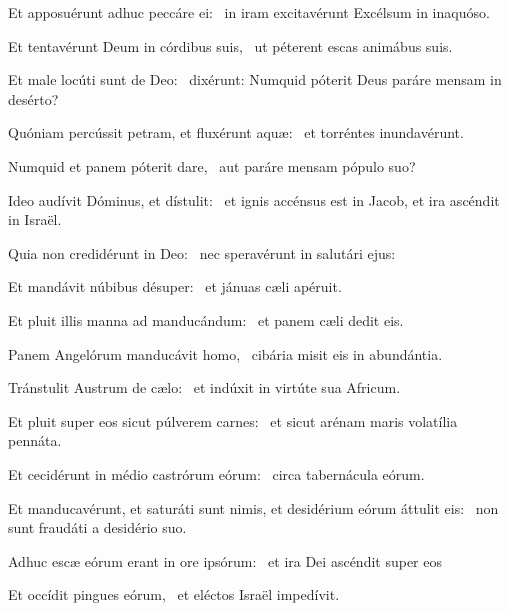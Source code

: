
\item Et apposuérunt adhuc peccáre ei:~\psstar{} in iram excitavérunt Excélsum in inaquóso.

\item Et tentavérunt Deum in córdibus suis,~\psstar{} ut péterent escas animábus suis.

\item Et male locúti sunt de Deo:~\psstar{} dixérunt: Numquid póterit Deus paráre mensam in desérto?

\item Quóniam percússit petram, et fluxérunt aquæ:~\psstar{} et torréntes inundavérunt.

\item Numquid et panem póterit dare,~\psstar{} aut paráre mensam pópulo suo?

\item Ideo audívit Dóminus, et dístulit:~\psstar{} et ignis accénsus est in Jacob, et ira ascéndit in Israël.

\item Quia non credidérunt in Deo:~\psstar{} nec speravérunt in salutári ejus:

\item Et mandávit núbibus désuper:~\psstar{} et jánuas cæli apéruit.

\item Et pluit illis manna ad manducándum:~\psstar{} et panem cæli dedit eis.

\item Panem Angelórum manducávit homo,~\psstar{} cibária misit eis in abundántia.

\item Tránstulit Austrum de cælo:~\psstar{} et indúxit in virtúte sua Africum.

\item Et pluit super eos sicut púlverem carnes:~\psstar{} et sicut arénam maris volatília pennáta.

\item Et cecidérunt in médio castrórum eórum:~\psstar{} circa tabernácula eórum.

\item Et manducavérunt, et saturáti sunt nimis, et desidérium eórum áttulit eis:~\psstar{} non sunt fraudáti a desidério suo.

\item Adhuc escæ eórum erant in ore ipsórum:~\psstar{} et ira Dei ascéndit super eos

\item Et occídit pingues eórum,~\psstar{} et eléctos Israël impedívit.
